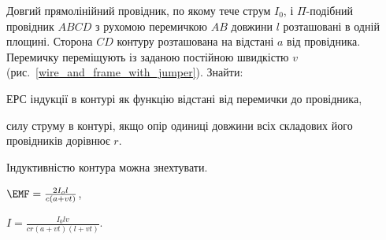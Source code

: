 \begin{problem}\label{prb:wire_and_frame_with_jumper}
Довгий прямолінійний провідник, по якому тече струм $I_0$, і $\Pi$-подібний провідник $ABCD$ з рухомою перемичкою $AB$ довжини $l$ розташовані в одній площині. Сторона $CD$ контуру розташована на відстані $a$ від провідника. Перемичку переміщують із заданою постійною швидкістю $v$ (рис.~\ref{wire_and_frame_with_jumper}). Знайти:
\begin{enumerate*}[label=\alph*)]
	\item ЕРС індукції в контурі як функцію відстані від перемички до провідника,
	\item силу струму в контурі, якщо опір одиниці довжини всіх складових його провідників дорівнює $r$.
\end{enumerate*}
Індуктивністю контура можна знехтувати.
\begin{solution}
	\begin{enumerate*}[label=\alph*)]
		\item $\EMF = \frac{2I_ol}{c(a+vt)}$,
		\item $I = \frac{I_0 l v}{cr(a+vt)(l+vt)}$.
	\end{enumerate*}
\end{solution}
\end{problem}



